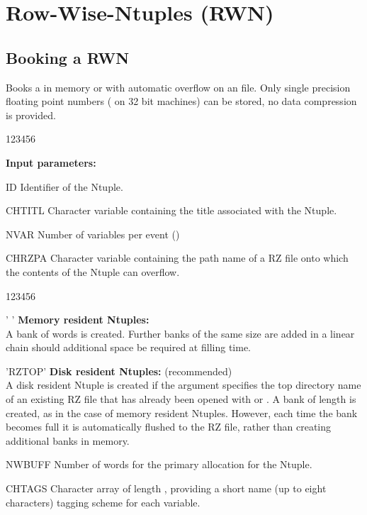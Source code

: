 \section{Row-Wise-Ntuples (RWN)}
\label{sec:NtupleRWN}
\subsection{Booking a RWN}
\label{HNTUBOOK}


\Action Books a \RWN{} in memory or with
automatic overflow on an  file.
Only single precision floating point numbers ( on
32 bit machines) can be stored, no data compression is provided.

\begin{DLttc}{123456}
\item[{\rm\bf Input parameters:}]
\item[ID] Identifier of the Ntuple.
\item[CHTITL] Character
    variable containing the title associated with the Ntuple.
\item[NVAR] Number of variables per event ()
\item[CHRZPA] Character variable containing the path
    name of a RZ file onto which the contents of the Ntuple
    can overflow.
    \begin{DLttc}{123456}
    \item[' '] {\bf Memory resident Ntuples:} \\
        A bank of  words is created.
        Further banks of the same size are added in a linear
        chain should additional space be required at filling time.
    \item['RZTOP'] {\bf Disk resident Ntuples:} (recommended) \\
        A disk resident Ntuple is created if the 
        argument specifies the top directory name of an existing RZ file
        that has already been opened with  or .
        A bank of length  is created, as in the case of
        memory resident Ntuples. However, each time the bank becomes full
        it is automatically flushed to the RZ file, rather than
        creating additional banks in memory.
    \end{DLttc}
\item[NWBUFF]Number of words for the primary allocation for the Ntuple.
\item[CHTAGS] Character array of length , providing a short
    name (up to eight characters) tagging scheme for each variable.
\end{DLttc}

